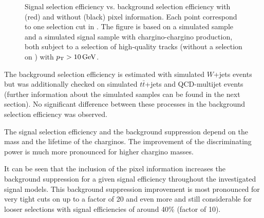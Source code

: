 \begin{figure}[!b]
\begin{tabular}{c}
  \end{tabular}
  \caption{Signal selection efficiency vs. background selection efficiency with (red) and without (black) pixel information.
           Each point correspond to one selection cut in \ias.
           The figure is based on a simulated \WJets sample and a simulated signal sample with chargino-chargino production, both subject to a selection of high-quality tracks (without a selection on \nhits) with $p_{\text{T}}>10\,\text{Ge}\kern-0.06667em\text{V}$.
       }
  \label{fig:ROCplots}
\end{figure} 
The background selection efficiency is estimated with simulated $W$+jets  events but was additionally checked on simulated $t\bar{t}$+jets  and QCD-multijet events 
(further information about the simulated samples can be found in the next section).
No significant difference between these processes in the background selection efficiency was observed.

The signal selection efficiency and the background suppression depend on the mass and the lifetime of the charginos.
The improvement of the discriminating power is much more pronounced for higher chargino masses.

It can be seen that the inclusion of the pixel information increases the background suppression for a given signal efficiency throughout the investigated signal models.
This background suppression improvement is most pronounced for very tight cuts on \ias up to a factor of 20 and even more and still considerable for looser selections with signal efficiencies of around 40\% (factor of 10).
